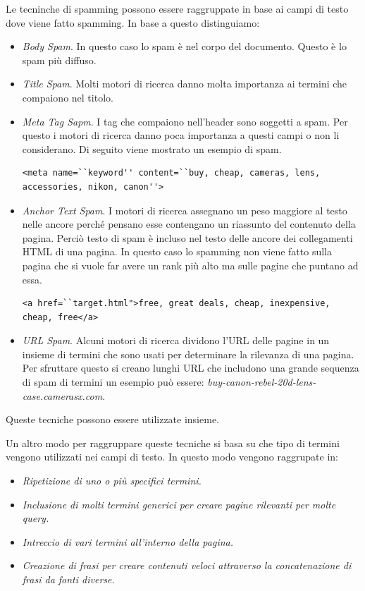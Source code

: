 Le tecninche di spamming possono essere raggruppate in base ai campi di testo dove viene fatto spamming. In base a questo distinguiamo:
\begin{itemize}
\item \textit{Body Spam}. In questo caso lo spam è nel corpo del documento. Questo è lo spam più diffuso.
\item \textit{Title Spam}. Molti motori di ricerca danno molta importanza ai termini che compaiono nel titolo.
\item \textit{Meta Tag Sapm}. I tag che compaiono nell'header sono soggetti a spam. Per questo i motori di ricerca danno poca importanza a questi campi o non li considerano. Di seguito viene mostrato un esempio di spam.
\begin{lstlisting}[frame=trbl,postbreak=\space, breakindent=5pt, breaklines]
 <meta name=``keyword'' content=``buy, cheap, cameras, lens, accessories, nikon, canon''>
\end{lstlisting}
\item \textit{Anchor Text Spam}. I motori di ricerca assegnano un peso maggiore al testo nelle ancore perché pensano esse contengano un riassunto del contenuto della pagina. Perciò testo di spam è incluso nel testo delle ancore dei collegamenti HTML di una pagina. In questo caso lo spamming non viene fatto sulla pagina che si vuole far avere un rank più alto ma sulle pagine che puntano ad essa.
\begin{lstlisting}[frame=trbl,postbreak=\space, breakindent=5pt, breaklines]
<a href=``target.html">free, great deals, cheap, inexpensive, cheap, free</a>
\end{lstlisting}
\item \textit{URL Spam}. Alcuni motori di ricerca dividono l'URL delle pagine in un insieme di termini che sono usati per determinare la rilevanza di una pagina. Per sfruttare questo si creano lunghi URL che includono una grande sequenza di spam di termini un esempio può essere: \textit{buy-canon-rebel-20d-lens-case.camerasx.com}.
\end{itemize}
Queste tecniche possono essere utilizzate insieme.

Un altro modo per raggruppare queste tecniche si basa su che tipo di termini vengono utilizzati nei campi di testo. In questo modo vengono raggrupate in:
\begin{itemize}
\item \textit{Ripetizione di uno o più specifici termini.}
\item \textit{Inclusione di molti termini generici per creare pagine rilevanti per molte query.}
\item \textit{Intreccio di vari termini all'interno della pagina.}
\item \textit{Creazione di frasi per creare contenuti veloci attraverso la concatenazione di frasi da fonti diverse.}
\end{itemize}


